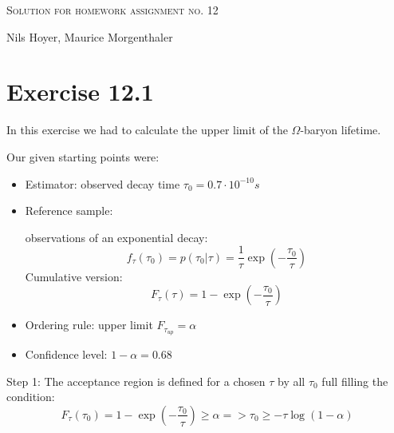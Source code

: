 \documentclass[10pt]{article}
\newenvironment{myfont}{\fontfamily{put}\selectfont}{\par}
\begin{document}
\begin{myfont}

\begin{center}
  \begin{Large}
    \textsc{Solution for homework assignment no. 12} \\
  \end{Large}
  \vspace*{0.4cm}
    Nils Hoyer, Maurice Morgenthaler
  \vspace*{1cm}
\end{center}

\section*{Exercise 12.1}
In this exercise we had to calculate the upper limit of the $\Omega$-baryon lifetime.

Our given starting points were:

\begin{itemize}
    \item Estimator: observed decay time $\tau_0 = \si{0.7 \cdot 10^{-10}s}$
    \item Reference sample: 
    
    observations of an exponential decay:
        \begin{equation}
            f_{\tau}(\tau_0) = p(\tau_0|\tau) = \frac{1}{\tau} \exp{\left(-\frac{\tau_0}{\tau}\right)}
        \end{equation}
    Cumulative version:
        \begin{equation}
            F_{\tau}(\tau) = 1 - \exp{\left(-\frac{\tau_0}{\tau}\right)}
        \end{equation}
    \item Ordering rule: upper limit $F_{\tau_{up}}=\alpha$
    \item Confidence level: $1 - \alpha = 0.68$
\end{itemize}

Step 1: The acceptance region is defined for a chosen $\tau$ by all $\tau_0$ full filling the condition:
    \begin{equation}
        F_{\tau}(\tau_0) = 1 - \exp{\left(-\frac{\tau_0}{\tau}\right)} \geq \alpha
        => \tau_0 \geq -\tau \log(1-\alpha)
    \end{equation}
    

\end{myfont}
\end{document}
